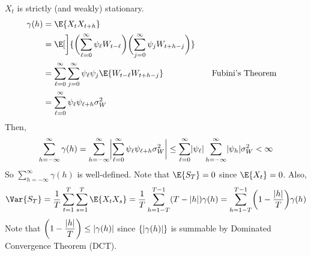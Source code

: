 \begin{Proof}{}{}
    $ X_t $ is strictly (and weakly) stationary.
    \begin{align*}
        \gamma(h)
         & =\E{X_t X_{t+h}}                                                                                                                                          \\
         & =\E[\bigg]{\biggl(\sum_{\ell=0}^{\infty} \psi_\ell W_{t-\ell}\biggr)\biggl(\sum_{j=0}^{\infty} \psi_j W_{t+h-j}\biggr)}                                   \\
         & =\sum_{\ell=0}^{\infty}\sum_{j=0}^{\infty} \psi_\ell\psi_j\E{W_{t-\ell}W_{t+h-j}}                                       & \quad & \text{Fubini's Theorem} \\
         & = \sum_{\ell=0}^{\infty} \psi_\ell \psi_{\ell+h}\sigma_W^2
    \end{align*}
    Then,
    \[ \sum_{h=-\infty}^{\infty} \gamma(h)=\sum_{h=-\infty}^{\infty}
        \abs[\bigg]{\sum_{\ell=0}^{\infty} \psi_\ell \psi_{\ell+h}\sigma_W^2}
        \le \sum_{\ell=0}^{\infty} \abs{\psi_\ell}\sum_{h=-\infty}^{\infty} \abs{\psi_h}\sigma_W^2<\infty \]
    So $ \sum_{h=-\infty}^{\infty} \gamma(h) $ is well-defined.
    Note that $ \E{S_T}=0 $ since $ \E{X_t}=0 $. Also,
    \[ \Var{S_T}=\frac{1}{T} \sum_{t=1}^{T} \sum_{s=1}^{T} \E{X_tX_s}=
        \frac{1}{T} \sum_{h=1-T}^{T-1} (T-\abs{h})\gamma(h)=\sum_{h=1-T}^{T-1}
        \biggl(1-\frac{\abs{h}}{T} \biggr)\gamma(h) \]
    Note that $ \displaystyle \biggl(1-\frac{\abs{h}}{T} \biggr)\le \abs{\gamma(h)} $
    since $ \set{\abs{\gamma(h)}} $ is summable by Dominated Convergence Theorem (DCT).


\end{Proof}
